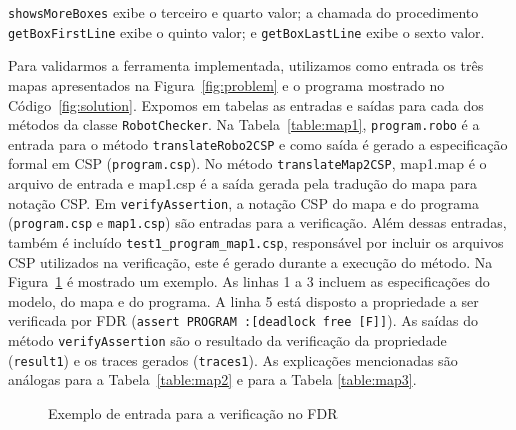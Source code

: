 \texttt{showsMoreBoxes} exibe o terceiro e quarto valor; a chamada do procedimento \texttt{getBoxFirstLine} exibe o quinto valor; e \texttt{getBoxLastLine} exibe o sexto valor.





Para validarmos a ferramenta implementada, utilizamos como entrada os três mapas apresentados na Figura~\ref{fig:problem} e o programa mostrado no Código~\ref{fig:solution}. Expomos em tabelas as entradas e saídas para cada dos métodos da classe \texttt{RobotChecker}. Na Tabela~\ref{table:map1}, \texttt{program.robo} é a entrada para o método \texttt{translateRobo2CSP} e como saída é gerado a especificação formal em CSP (\texttt{program.csp}). No método \texttt{translateMap2CSP}, map1.map é o arquivo de entrada e map1.csp é a saída gerada pela tradução do mapa para notação CSP. Em \texttt{verifyAssertion}, a notação CSP do mapa e do programa (\texttt{program.csp} e \texttt{map1.csp}) são entradas para a verificação. Além dessas entradas, também é incluído \texttt{test1\_program\_map1.csp}, responsável por incluir os arquivos CSP utilizados na verificação, este é gerado durante a execução do método. Na Figura~\ref{fig:test} é mostrado um exemplo. As linhas 1 a 3 incluem as especificações do modelo, do mapa e do programa. A linha 5 está disposto a propriedade a ser verificada por FDR (\texttt{assert PROGRAM :[deadlock free [F]]}). As saídas do método \texttt{verifyAssertion} são o resultado da verificação da propriedade (\texttt{result1}) e os traces gerados (\texttt{traces1}). As explicações mencionadas são análogas para a Tabela~\ref{table:map2} e para a Tabela \ref{table:map3}.

\begin{figure}[!h]
\centering
\caption{Exemplo de entrada para a verificação no FDR}

\label{fig:test}
\end{figure}

\begin{table}[h]
\caption{Entradas e saídas para o mapa 1}
\label{table:map1}
\end{table}

